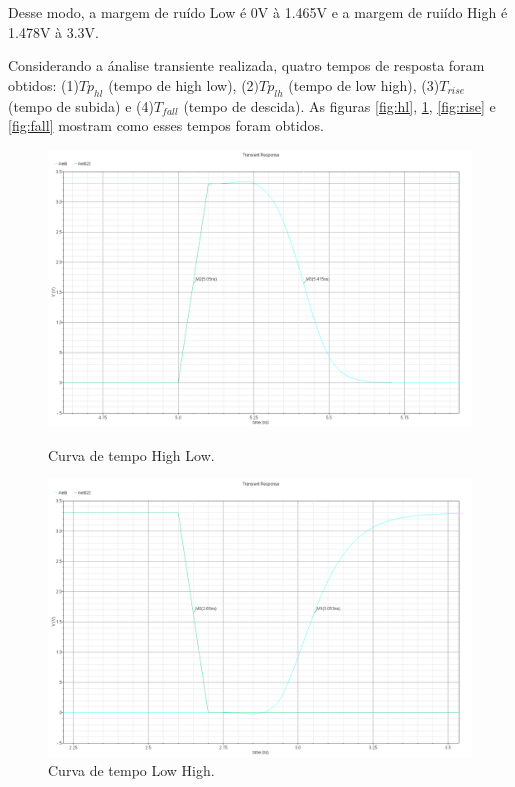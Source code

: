 \documentclass[a4paper,10pt] {article}
\begin{document}
Desse modo, a margem de ruído Low é 0V à 1.465V e a margem de ruiído High é 1.478V à 3.3V.

Considerando a ánalise transiente realizada, quatro tempos de resposta foram obtidos: (1)$Tp_{hl}$ (tempo de high low), (2$)Tp_{lh}$ (tempo de low high), (3)$T_{rise}$ (tempo de subida) e (4)$T_{fall}$ (tempo de descida). As figuras \ref{fig:hl}, \ref{fig:lh}, \ref{fig:rise} e \ref{fig:fall} mostram como esses tempos foram obtidos.

\begin{figure} [h]
	\begin{minipage} [b] {0.48 \linewidth}
		\includegraphics[scale=0.1]{Trans_HL.png}
		\centering
		\caption{Curva de tempo High Low.}
		\label{fig:hl}
	\end{minipage}
	\begin{minipage} [b] {0.48 \linewidth}
		\includegraphics[scale=0.1]{Trans_LH.png}
		\centering
		\caption{Curva de tempo Low High.}
		\label{fig:lh}
	\end{minipage}
\end{figure}
\end{document}
